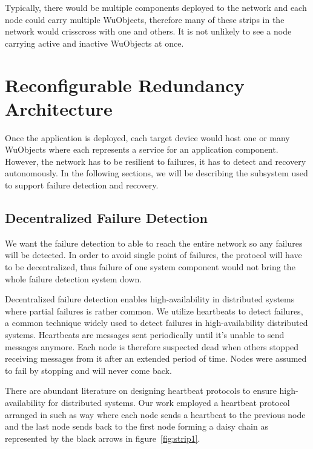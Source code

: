 Typically, there would be multiple components deployed to the network and each
node could carry multiple WuObjects, therefore many of these strips in the
network would crisscross with one and others. It is not unlikely to see a node
carrying active and inactive WuObjects at once.

\section{Reconfigurable Redundancy Architecture}

Once the application is deployed, each target device would host one or many
WuObjects where each represents a service for an application component. However,
the network has to be resilient to failures, it has to detect and recovery
autonomously. In the following sections, we will be describing the subsystem
used to support failure detection and recovery.

\subsection{Decentralized Failure Detection}
\label{s:dfd}

We want the failure detection to able to reach the entire network so any
failures will be detected. In order to avoid single point of failures, the
protocol will have to be decentralized, thus failure of one system component would
not bring the whole failure detection system down.

Decentralized failure detection enables high-availability in distributed systems
where partial failures is rather common.  We utilize heartbeats to detect
failures, a common technique widely used to detect failures in high-availability
distributed systems.  Heartbeats are messages sent periodically until it's
unable to send messages anymore. Each node is therefore suspected dead when
others stopped receiving messages from it after an extended period of time.
Nodes were assumed to fail by stopping and will never come back.

There are abundant literature on designing heartbeat protocols to ensure
high-availability for distributed systems. Our work employed a heartbeat
protocol arranged in such as way where each node sends a heartbeat to the
previous node and the last node sends back to the first node forming a daisy
chain as represented by the black arrows in figure~\ref{fig:strip1}.

